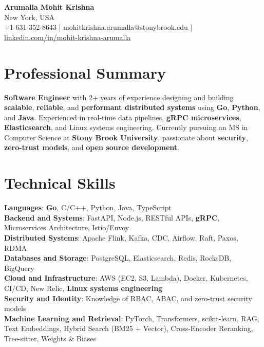 \documentclass[letterpaper,11pt]{article}
\begin{document}
\begin{center}
  {\Large \textbf{Arumalla Mohit Krishna}} \\
  New York, USA \\
  +1-631-352-8643 \enspace | \enspace mohitkrishna.arumalla@stonybrook.edu \enspace | \enspace \href{https://www.linkedin.com/in/mohit-krishna-arumalla}{linkedin.com/in/mohit-krishna-arumalla}
\end{center}

\section{Professional Summary}
  \begin{itemize}[leftmargin=0.15in, label={}]
    \small{\item{
     \textbf{Software Engineer} with 2+ years of experience designing and building \textbf{scalable}, \textbf{reliable}, and \textbf{performant distributed systems} using \textbf{Go}, \textbf{Python}, and \textbf{Java}. Experienced in real-time data pipelines, \textbf{gRPC microservices}, \textbf{Elasticsearch}, and Linux systems engineering. Currently pursuing an MS in Computer Science at \textbf{Stony Brook University}, passionate about \textbf{security}, \textbf{zero-trust models}, and \textbf{open source development}.
    }}
  \end{itemize}
\vspace{-16pt}

\section{Technical Skills}
 \begin{itemize}[leftmargin=0.15in, label={}]
    \small{\item{
     \textbf{Languages}: \textbf{Go}, C/C++, Python, Java, TypeScript \\
     \textbf{Backend and Systems}: FastAPI, Node.js, RESTful APIs, \textbf{gRPC}, Microservices Architecture, Istio/Envoy \\
     \textbf{Distributed Systems}: Apache Flink, Kafka, CDC, Airflow, Raft, Paxos, RDMA \\
     \textbf{Databases and Storage}: PostgreSQL, Elasticsearch, Redis, RocksDB, BigQuery \\
     \textbf{Cloud and Infrastructure}: AWS (EC2, S3, Lambda), Docker, Kubernetes, CI/CD, New Relic, \textbf{Linux systems engineering} \\
     \textbf{Security and Identity}: Knowledge of RBAC, ABAC, and zero-trust security models \\
     \textbf{Machine Learning and Retrieval}: PyTorch, Transformers, scikit-learn, RAG, Text Embeddings, Hybrid Search (BM25 + Vector), Cross-Encoder Reranking, Tree-sitter, Weights \& Biases
    }}
 \end{itemize}
\vspace{-16pt}
\end{document}
